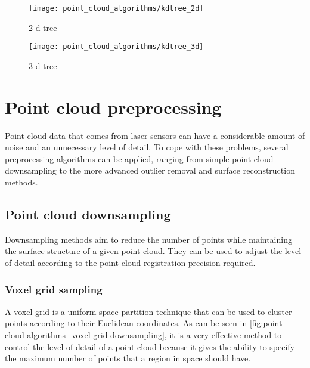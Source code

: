\begin{savenotes}
\begin{figure}[ht]
	\centering
	\begin{minipage}[h]{0.495\textwidth}
		\centering
		\texttt{[image: point\_cloud\_algorithms/kdtree\_2d]}
		\caption{2-d tree\protect\footnotemark}
		\label{fig:point-cloud-algorithms_2d-tree}
	\end{minipage}\hfill
	\begin{minipage}[h]{0.495\textwidth}
		\centering
		\texttt{[image: point\_cloud\_algorithms/kdtree\_3d]}
		\caption{3-d tree\protect\footnotemark}
		\label{fig:point-cloud-algorithms_3d-tree}
	\end{minipage}
\end{figure}
\end{savenotes}



\section{Point cloud preprocessing}

Point cloud data that comes from laser sensors can have a considerable amount of noise and an unnecessary level of detail. To cope with these problems, several preprocessing algorithms can be applied, ranging from simple point cloud downsampling to the more advanced outlier removal and surface reconstruction methods.


\subsection{Point cloud downsampling}

Downsampling methods aim to reduce the number of points while maintaining the surface structure of a given point cloud. They can be used to adjust the level of detail according to the point cloud registration precision required.


\subsubsection{Voxel grid sampling}

A voxel grid is a uniform space partition technique that can be used to cluster points according to their Euclidean coordinates. As can be seen in \cref{fig:point-cloud-algorithms_voxel-grid-downsampling}, it is a very effective method to control the level of detail of a point cloud because it gives the ability to specify the maximum number of points that a region in space should have.

